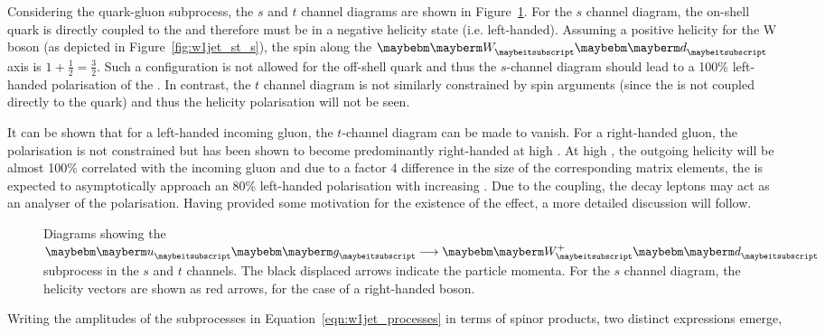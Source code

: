 Considering the quark-gluon subprocess, the $s$ and $t$ channel diagrams are
shown in Figure~\ref{fig:w1jet_st}. For the $s$ channel diagram, the on-shell
\Pdown quark is directly coupled to the \PW and therefore must be in a negative
helicity state (i.e. left-handed). Assuming a positive helicity for the W boson
(as depicted in Figure~\ref{fig:w1jet_st_s}), the spin along the $\PW\Pdown$
axis is $1+\frac{1}{2} = \frac{3}{2}$. Such a configuration is not allowed for the
\spinhalf off-shell quark and thus the $s$-channel diagram should lead to a 100\%
left-handed polarisation of the \PW. In contrast, the $t$ channel diagram is not
similarly constrained by spin arguments (since the \PW is not coupled directly
to the quark) and thus the helicity polarisation will not be seen.

It can be shown that for a left-handed incoming gluon, the $t$-channel diagram
can be made to vanish. For a right-handed gluon, the \PW polarisation is not
constrained but has been shown to become predominantly right-handed at high
\PtW. At high \PtW, the outgoing \PW helicity will be almost 100\% correlated
with the incoming gluon and due to a factor 4 difference in the size of the
corresponding matrix elements, the \PW is expected to asymptotically approach an
80\% left-handed polarisation with increasing \PtW. Due to the \VminusA
coupling, the decay leptons may act as an analyser of the \PW
polarisation. Having provided some motivation for the existence of the effect, a
more detailed discussion will follow.

\begin{figure}
\centering
{}\quad
{}
\caption{Diagrams showing the $\Pup\Pgluon\longrightarrow\PWp\Pdown$ subprocess
  in the  $s$ and  $t$ channels. The black displaced arrows indicate the particle
  momenta. For the $s$ channel diagram, the helicity vectors are shown as red
  arrows, for the case of a right-handed \PW boson.}
\label{fig:w1jet_st}
\end{figure}

Writing the amplitudes of the subprocesses in Equation~\ref{eqn:w1jet_processes}
in terms of spinor products, two distinct expressions emerge,

